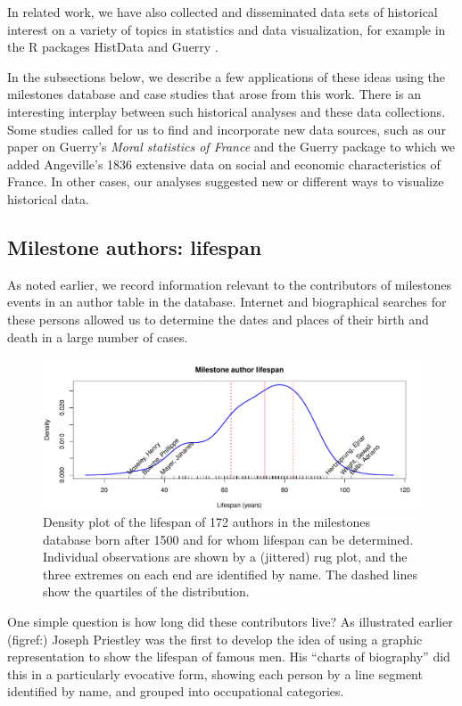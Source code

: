 \documentclass[11pt]{article}
\begin{document}
In related work, we have also collected and disseminated
data sets of historical interest on a variety of
topics in statistics and data visualization, for example in the R packages
HistData \citep{HistData} and Guerry \citep{Guerry}.

In the subsections below, we describe a few applications of these ideas using the milestones
database and case studies that arose from this work. There is an interesting interplay between
such historical analyses and these data collections. Some studies called for us to find and
incorporate new data sources, such as our paper \citep{Friendly:2007:guerry} on
Guerry's \emph{Moral statistics of France} and the Guerry package to which we added
Angeville's 1836
extensive data on social and economic characteristics of France.
In other cases, our analyses suggested new or different ways to visualize historical data.

\subsection{Milestone authors: lifespan}\label{sec:lifespan}
As noted earlier, we record information relevant to the contributors of milestones events in an
author table in the database. Internet and biographical searches for these persons allowed us
to determine the dates and places of their birth and death in a large number of cases.

\begin{figure}[!htb]
  \centering
  \includegraphics[width=\textwidth,clip]{fig/lifespan}
  \caption{Density plot of the lifespan of 172 authors in the milestones database born after 1500 and for whom
  lifespan can be determined. Individual observations are shown by a (jittered) rug plot, and the three extremes
  on each end are identified by name.  The dashed lines show the quartiles of the distribution.
  }
  \label{fig:lifespan}
\end{figure}

One simple question is how long did these contributors live? As illustrated earlier (figref:)
Joseph Priestley was the first to develop the idea of using a graphic representation to show
the lifespan of famous men. His ``charts of biography'' did this in a particularly evocative
form, showing each person by a line segment identified by name, and grouped into
occupational categories.
\end{document}
